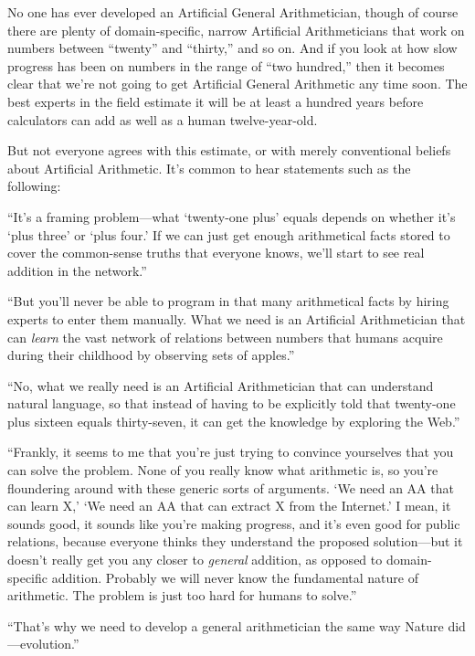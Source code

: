 {
 No one has ever developed an Artificial General Arithmetician,
though of course there are plenty of domain-specific, narrow Artificial
Arithmeticians that work on numbers between
``twenty'' and
``thirty,'' and so on. And if you
look at how slow progress has been on numbers in the range of
``two hundred,'' then it becomes
clear that we're not going to get Artificial General
Arithmetic any time soon. The best experts in the field estimate it
will be at least a hundred years before calculators can add as well as
a human twelve-year-old.}

{
 But not everyone agrees with this estimate, or with merely
conventional beliefs about Artificial Arithmetic. It's
common to hear statements such as the following:}

{
 ``It's a framing problem---what
`twenty-one plus' equals depends on
whether it's `plus
three' or `plus four.'
If we can just get enough arithmetical facts stored to cover the
common-sense truths that everyone knows, we'll start to
see real addition in the network.''}

{
 ``But you'll never be able to
program in that many arithmetical facts by hiring experts to enter them
manually. What we need is an Artificial Arithmetician that can
\textit{learn} the vast network of relations between numbers that
humans acquire during their childhood by observing sets of
apples.''}

{
 ``No, what we really need is an Artificial
Arithmetician that can understand natural language, so that instead of
having to be explicitly told that twenty-one plus sixteen equals
thirty-seven, it can get the knowledge by exploring the
Web.''}

{
 ``Frankly, it seems to me that
you're just trying to convince yourselves that you can
solve the problem. None of you really know what arithmetic is, so
you're floundering around with these generic sorts of
arguments. `We need an AA that can learn
X,' `We need an AA that can extract X
from the Internet.' I mean, it sounds good, it sounds
like you're making progress, and it's
even good for public relations, because everyone thinks they understand
the proposed solution---but it doesn't really get you
any closer to \textit{general} addition, as opposed to domain-specific
addition. Probably we will never know the fundamental nature of
arithmetic. The problem is just too hard for humans to
solve.''}

{
 ``That's why we need to develop a
general arithmetician the same way Nature
did---evolution.''}

